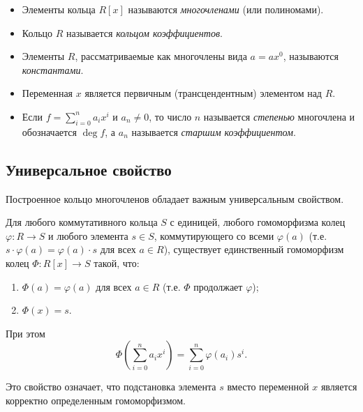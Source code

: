 \documentclass[a4paper,12pt]{article}
\theoremstyle{definition}
\theoremstyle{plain}
\theoremstyle{remark}
\begin{document}
	\begin{tcolorbox}[colback=yellow!5, colframe=orange!50!black, title=Терминология]
		\begin{itemize}
			\item Элементы кольца \( R[x] \) называются \textit{многочленами} (или полиномами).
			\item Кольцо \( R \) называется \textit{кольцом коэффициентов}.
			\item Элементы \( R \), рассматриваемые как многочлены вида \( a = a x^0 \), называются \textit{константами}.
			\item Переменная \( x \) является первичным (трансцендентным) элементом над \( R \).
			\item Если \( f = \sum_{i=0}^{n} a_i x^i \) и \( a_n \neq 0 \), то число \( n \) называется \textit{степенью} многочлена и обозначается \( \deg f \), а \( a_n \) называется \textit{старшим коэффициентом}.
		\end{itemize}
	\end{tcolorbox}
	
	\subsection{Универсальное свойство}
	
	Построенное кольцо многочленов обладает важным универсальным свойством.
	
	\begin{tcolorbox}[colback=blue!5, colframe=blue!40!black, title=Теорема (Универсальное свойство)]
		Для любого коммутативного кольца \( S \) с единицей, любого гомоморфизма колец \( \varphi: R \to S \) и любого элемента \( s \in S \), коммутирующего со всеми \( \varphi(a) \) (т.е. \( s \cdot \varphi(a) = \varphi(a) \cdot s \) для всех \( a \in R \)), существует единственный гомоморфизм колец \( \Phi: R[x] \to S \) такой, что:
		\begin{enumerate}
			\item \( \Phi(a) = \varphi(a) \) для всех \( a \in R \) (т.е. \( \Phi \) продолжает \( \varphi \));
			\item \( \Phi(x) = s \).
		\end{enumerate}
		При этом
		\[
		\Phi\left( \sum_{i=0}^{n} a_i x^i \right) = \sum_{i=0}^{n} \varphi(a_i) s^i.
		\]
	\end{tcolorbox}
	
	Это свойство означает, что подстановка элемента \( s \) вместо переменной \( x \) является корректно определенным гомоморфизмом.
	
\end{document}
